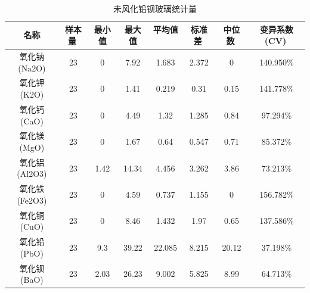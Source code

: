 \documentclass{my_paper}
\begin{document}
\begin{enumerate}
\begin{itemize}
        \begin{table}[ht]
            \centering
            \caption{未风化铅钡玻璃统计量}
            \begin{tabular}{cccccccc}
            \toprule
            名称                   & 样本量                 & 最小值                  & 最大值                  & 平均值                 & 标准差                 & 中位数                 & 变异系数(CV)            \\
            \midrule
            氧化钠(Na2O)            & 23                   & 0                    & 7.92                 & 1.683                & 2.372                & 0                    & 140.950\%            \\
            氧化钾(K2O)             & 23                   & 0                    & 1.41                 & 0.219                & 0.31                 & 0.15                 & 141.778\%            \\
            氧化钙(CaO)             & 23                   & 0                    & 4.49                 & 1.32                 & 1.285                & 0.84                 & 97.294\%             \\
            氧化镁(MgO)             & 23                   & 0                    & 1.67                 & 0.64                 & 0.547                & 0.71                 & 85.372\%             \\
            氧化铝(Al2O3)           & 23                   & 1.42                 & 14.34                & 4.456                & 3.262                & 3.86                 & 73.213\%             \\
            氧化铁(Fe2O3)           & 23                   & 0                    & 4.59                 & 0.737                & 1.155                & 0                    & 156.782\%            \\
            氧化铜(CuO)             & 23                   & 0                    & 8.46                 & 1.432                & 1.97                 & 0.65                 & 137.586\%            \\
            氧化铅(PbO)             & 23                   & 9.3                  & 39.22                & 22.085               & 8.215                & 20.12                & 37.198\%             \\
            氧化钡(BaO)             & 23                   & 2.03                 & 26.23                & 9.002                & 5.825                & 8.99                 & 64.713\%             \\

\end{tabular}
\end{table}
\end{itemize}
\end{enumerate}
\end{document}
